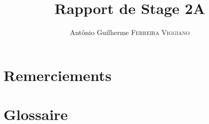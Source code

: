 \documentclass[12pt]{article}
\title{Rapport de Stage 2A}
\author{Antônio Guilherme \textsc{Ferreira Viggiano}}
\begin{document}


\renewcommand*{\glspostdescription}{. Page:}
\renewcommand*{\glossaryname}{}

\pagebreak	
\tableofcontents


\pagebreak
\section{Remerciements}



\pagebreak
\section{Glossaire}
\printglossary

\pagebreak

\end{document}
